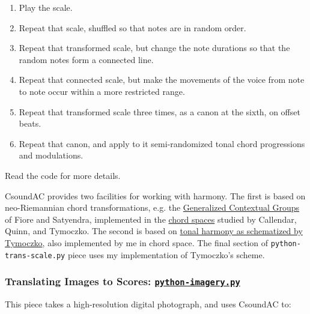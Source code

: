 \documentclass[letterpaper,10pt,DIV=12,parskip=half]{scrartcl}
\begin{document}
\begin{enumerate}
\item Play the scale.
\item Repeat that scale, shuffled so that notes are in random order.
\item Repeat that transformed scale, but change the note durations so that the random notes form a connected line.
\item Repeat that connected scale, but make the movements of the voice from note to note occur within a more restricted range.
\item Repeat that transformed scale three times, as a canon at the sixth, on offset beats.
\item Repeat that canon, and apply to it semi-randomized tonal chord progressions and modulations.
\end{enumerate}

Read the code for more details.

\begin{canaryframed}
CsoundAC provides two facilities for working with harmony. The first is based on neo-Riemannian chord transformations, e.g. the \href{https://www.mtosmt.org/issues/mto.05.11.3/mto.05.11.3.fiore_satyendra.pdf}{Generalized Contextual Groups} of Fiore and Satyendra, implemented in the \href{https://dmitri.mycpanel.princeton.edu/files/publications/science2.pdf}{chord spaces} studied by Callendar, Quinn, and Tymoczko. The second is based on \href{https://doi.org/10.1093/oso/9780197577103.001.0001}{tonal harmony as schematized by Tymoczko}, also implemented by me in chord space. The final section of \lstinline|python-trans-scale.py| piece uses my implementation of Tymoczko's scheme.
\end{canaryframed}

\subsubsection{Translating Images to Scores:  \href{https://github.com/gogins/csound-ac/blob/master/user-guide/python-imagery.py}{\lstinline|python-imagery.py|}}

This piece takes a high-resolution digital photograph, and uses CsoundAC to:
\end{document}
